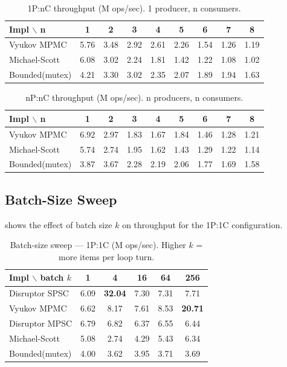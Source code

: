 \documentclass[11pt,a4paper]{article}
\begin{document}
\begin{table}[H]
\centering
\caption{1P:nC throughput (M ops/sec). 1 producer, n consumers.}
\label{tab:1pnc}
\begin{tabular}{@{}lcccccccc@{}}
\toprule
Impl $\backslash$ n & 1 & 2 & 3 & 4 & 5 & 6 & 7 & 8 \\
\midrule
Vyukov MPMC    & 5.76 & 3.48 & 2.92 & 2.61 & 2.26 & 1.54 & 1.26 & 1.19 \\
Michael-Scott  & 6.08 & 3.02 & 2.24 & 1.81 & 1.42 & 1.22 & 1.08 & 1.02 \\
Bounded(mutex) & 4.21 & 3.30 & 3.02 & 2.35 & 2.07 & 1.89 & 1.94 & 1.63 \\
\bottomrule
\end{tabular}
\end{table}

\begin{table}[H]
\centering
\caption{nP:nC throughput (M ops/sec). n producers, n consumers.}
\label{tab:npnc}
\begin{tabular}{@{}lcccccccc@{}}
\toprule
Impl $\backslash$ n & 1 & 2 & 3 & 4 & 5 & 6 & 7 & 8 \\
\midrule
Vyukov MPMC    & 6.92 & 2.97 & 1.83 & 1.67 & 1.84 & 1.46 & 1.28 & 1.21 \\
Michael-Scott  & 5.74 & 2.74 & 1.95 & 1.62 & 1.43 & 1.29 & 1.22 & 1.14 \\
Bounded(mutex) & 3.87 & 3.67 & 2.28 & 2.19 & 2.06 & 1.77 & 1.69 & 1.58 \\
\bottomrule
\end{tabular}
\end{table}

\subsection{Batch-Size Sweep }
\label{subsec:batch}

 shows the effect of batch size $k$ on throughput for the 1P:1C configuration.

\begin{table}[H]
\centering
\caption{Batch-size sweep — 1P:1C (M ops/sec). Higher $k$ = more items per loop turn.}
\label{tab:batch}
\begin{tabular}{@{}lccccc@{}}
\toprule
Impl $\backslash$ batch $k$ & 1 & 4 & 16 & 64 & 256 \\
\midrule
Disruptor SPSC  & 6.09 & \textbf{32.04} & 7.30 & 7.31 & 7.71 \\
Vyukov MPMC     & 6.62 & 8.17  & 7.61 & 8.53 & \textbf{20.71} \\
Disruptor MPSC  & 6.79 & 6.82  & 6.37 & 6.55 & 6.44 \\
Michael-Scott   & 5.08 & 2.74  & 4.29 & 5.43 & 6.34 \\
Bounded(mutex)  & 4.00 & 3.62  & 3.95 & 3.71 & 3.69 \\
\bottomrule
\end{tabular}
\end{table}
\end{document}
